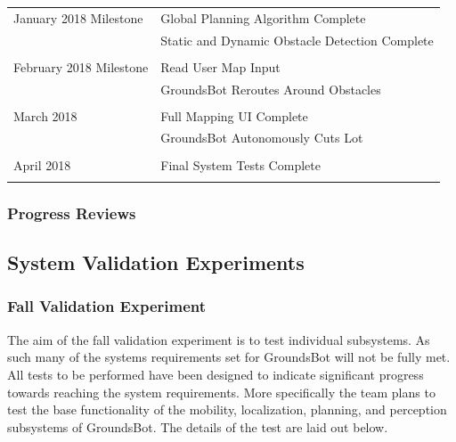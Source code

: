 \documentclass[12pt]{extarticle}
\begin{document}
\begin{table}[H]
\begin{tabular}{ll}
January 2018 Milestone 

    &Global Planning Algorithm Complete          \\
    &Static and Dynamic Obstacle Detection Complete\\
                                               \\
February 2018 Milestone 
  
    &Read User Map Input                        \\
    &GroundsBot Reroutes Around Obstacles       \\
                                              \\
March 2018 
  
    &Full Mapping UI Complete                   \\
    &GroundsBot Autonomously Cuts Lot           \\
                                              \\
April 2018 

    &Final System Tests Complete                \\                                            \\
\end{tabular}

\end{table}

\subsubsection{Progress Reviews}

\subsection{System Validation Experiments}
\subsubsection{Fall Validation Experiment}

	The aim of the fall validation experiment is to test individual subsystems. As such many of the systems requirements set for GroundsBot will not be fully met. All tests to be performed have been designed to indicate significant progress towards reaching the system requirements. More specifically the team plans to test the base functionality of the mobility, localization, planning, and perception subsystems of GroundsBot. The details of the test are laid out below.
		
\end{document}
